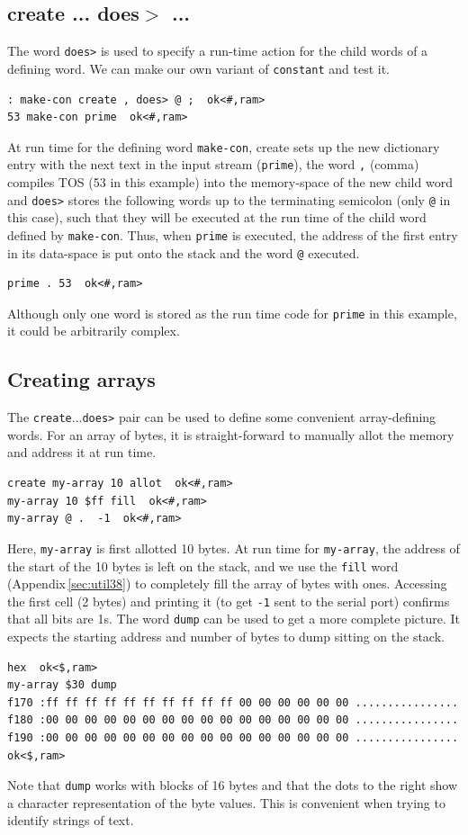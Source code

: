 \documentclass[12pt,a4paper]{article}
\begin{document}
\subsection{create ... does$>$ ...}
\label{sec:create-does}
%
The word \verb!does>! is used to specify a run-time action for the child words of
a defining word.
We can make our own variant of \verb!constant! and test it.
\begin{verbatim}
: make-con create , does> @ ;  ok<#,ram>
53 make-con prime  ok<#,ram>
\end{verbatim}
At run time for the defining word \verb!make-con!, create sets up the new dictionary entry with the 
next text in the input stream (\verb!prime!), the word \verb!,! (comma) compiles TOS 
(53 in this example) into the memory-space of the new child word and 
\verb!does>! stores the following words up to the terminating
semicolon (only \verb!@! in this case), such that they will be executed at the run time
of the child word defined by \verb!make-con!.
Thus, when \verb!prime! is executed, the address of the first entry in its data-space 
is put onto the stack and the word \verb!@! executed.
\begin{verbatim}
prime . 53  ok<#,ram>
\end{verbatim}
Although only one word is stored as the run time code for \verb!prime! in this example, 
it could be arbitrarily complex.


\subsection{Creating arrays}
\label{sec:creating-arrays}
%
The \verb!create!...\verb!does>! pair can be used to define some convenient 
array-defining words.
For an array of bytes, it is straight-forward to manually allot the
memory and address it at run time.
\begin{verbatim}
create my-array 10 allot  ok<#,ram>
my-array 10 $ff fill  ok<#,ram>
my-array @ .  -1  ok<#,ram>
\end{verbatim}
Here, \verb!my-array! is first allotted 10 bytes.
At run time for \verb!my-array!, the address of the start of the 10 bytes is left on 
the stack, and we use the \verb!fill! word (Appendix\,\ref{sec:util38}) 
to completely fill the array of bytes with ones.
Accessing the first cell (2 bytes) and printing it (to get \verb!-1! sent to the serial port)
confirms that all bits are 1s.
The word \verb!dump! can be used to get a more complete picture.
It expects the starting address and number of bytes to dump sitting on the stack.
\begin{verbatim}
hex  ok<$,ram>
my-array $30 dump 
f170 :ff ff ff ff ff ff ff ff ff ff 00 00 00 00 00 00 ................
f180 :00 00 00 00 00 00 00 00 00 00 00 00 00 00 00 00 ................
f190 :00 00 00 00 00 00 00 00 00 00 00 00 00 00 00 00 ................ ok<$,ram>
\end{verbatim}
Note that \verb!dump! works with blocks of 16 bytes and that the dots to the right
show a character representation of the byte values.
This is convenient when trying to identify strings of text.
\end{document}
